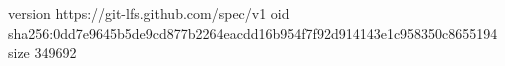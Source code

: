 version https://git-lfs.github.com/spec/v1
oid sha256:0dd7e9645b5de9cd877b2264eacdd16b954f7f92d914143e1c958350c8655194
size 349692
